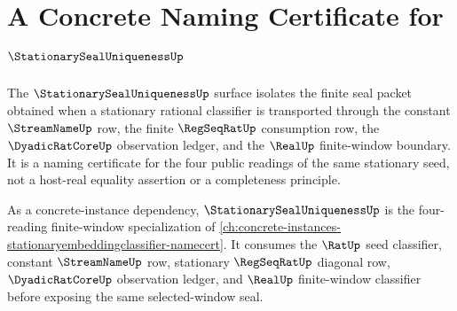 \chapter{A Concrete Naming Certificate for $\StationarySealUniquenessUp$}
\label{ch:concrete-instances-stationary-seal-uniqueness-namecert}

The $\StationarySealUniquenessUp$ surface isolates the finite seal packet obtained when a stationary rational classifier is transported through the constant $\StreamNameUp$ row, the finite $\RegSeqRatUp$ consumption row, the $\DyadicRatCoreUp$ observation ledger, and the $\RealUp$ finite-window boundary. It is a naming certificate for the four public readings of the same stationary seed, not a host-real equality assertion or a completeness principle.

As a concrete-instance dependency, $\StationarySealUniquenessUp$ is the four-reading finite-window specialization of \autoref{ch:concrete-instances-stationaryembeddingclassifier-namecert}. It consumes the $\RatUp$ seed classifier, constant $\StreamNameUp$ row, stationary $\RegSeqRatUp$ diagonal row, $\DyadicRatCoreUp$ observation ledger, and $\RealUp$ finite-window classifier before exposing the same selected-window seal.


